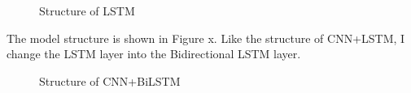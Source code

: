 \documentclass{article}
\begin{document}
\begin{figure}[h]
	\centering
	\caption{Structure of LSTM}
\end{figure} 

The model structure is shown in Figure x. Like the structure of CNN+LSTM, I change the LSTM layer into the Bidirectional LSTM layer.

\begin{figure}[h]
	\centering
	\caption{Structure of CNN+BiLSTM}
\end{figure} 
\end{document}
